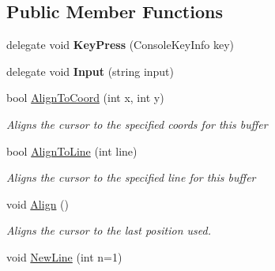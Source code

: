 \subsection*{Public Member Functions}
\begin{DoxyCompactItemize}
\item 
\hypertarget{class_m_b_c_1_1_app_1_1_terminal_1_1_terminal_module_a1c38612e63ac6dee0a8508dff99685e2}{delegate void {\bfseries Key\-Press} (Console\-Key\-Info key)}\label{class_m_b_c_1_1_app_1_1_terminal_1_1_terminal_module_a1c38612e63ac6dee0a8508dff99685e2}

\item 
\hypertarget{class_m_b_c_1_1_app_1_1_terminal_1_1_terminal_module_a2663bd41ea43a72eab6074bf7dae96d8}{delegate void {\bfseries Input} (string input)}\label{class_m_b_c_1_1_app_1_1_terminal_1_1_terminal_module_a2663bd41ea43a72eab6074bf7dae96d8}

\item 
bool \hyperlink{class_m_b_c_1_1_app_1_1_terminal_1_1_terminal_module_a439526c49a5812e6e0a9c37915bd1fe7}{Align\-To\-Coord} (int x, int y)
\begin{DoxyCompactList}\small\item\em Aligns the cursor to the specified coords for this buffer\end{DoxyCompactList}\item 
bool \hyperlink{class_m_b_c_1_1_app_1_1_terminal_1_1_terminal_module_af516101ca4ddb24c427cb027a8fee5f2}{Align\-To\-Line} (int line)
\begin{DoxyCompactList}\small\item\em Aligns the cursor to the specified line for this buffer\end{DoxyCompactList}\item 
\hypertarget{class_m_b_c_1_1_app_1_1_terminal_1_1_terminal_module_a7ed4b33386492ec3a52f3efc93b5bb35}{void \hyperlink{class_m_b_c_1_1_app_1_1_terminal_1_1_terminal_module_a7ed4b33386492ec3a52f3efc93b5bb35}{Align} ()}\label{class_m_b_c_1_1_app_1_1_terminal_1_1_terminal_module_a7ed4b33386492ec3a52f3efc93b5bb35}

\begin{DoxyCompactList}\small\item\em Aligns the cursor to the last position used.\end{DoxyCompactList}\item 
\hypertarget{class_m_b_c_1_1_app_1_1_terminal_1_1_terminal_module_a171493f7965171c51b0b94da98468571}{void \hyperlink{class_m_b_c_1_1_app_1_1_terminal_1_1_terminal_module_a171493f7965171c51b0b94da98468571}{New\-Line} (int n=1)}\label{class_m_b_c_1_1_app_1_1_terminal_1_1_terminal_module_a171493f7965171c51b0b94da98468571}


\end{DoxyCompactItemize}
